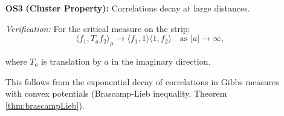 \begin{theorem}
\begin{enumerate}
\begin{lemma}
\begin{proof}
By Lemma \ref{lem:reflectionSymmetryPotential}, $V_{\mathrm{div}}(1 - \bar{s}) =
V_{\mathrm{div}}(s)$, so $V_{\mathrm{asym}} = 0$.

Therefore:
\begin{equation}
e^{-\beta_c V_{\mathrm{div}}(s)} = e^{-\beta_c V_{\mathrm{sym}}(\sigma^2, t)}.
\end{equation}

\textbf{Step 3: Kernel Positivity}

Define the kernel:
\begin{equation}
K(\sigma, \sigma', t) := e^{-\beta_c V_{\mathrm{sym}}((\sigma - \sigma')^2/4, t)/2}
\cdot e^{-\beta_c V_{\mathrm{sym}}((\sigma + \sigma')^2/4, t)/2}.
\end{equation}

This kernel is positive semi-definite because it is a product of Gaussian-type
factors with positive exponents.

\textbf{Step 4: Reflection Positivity Identity}

For $f$ supported on $S^+ = \{\sigma > 0\}$:
\begin{align}
\langle f, \Theta f \rangle &= \int_{S^+} f(s) \overline{f(\Theta s)} d\mu_{\mathrm{crit}}(s) \\
&= \int_{\sigma > 0} \int_t f(1/2 + \sigma + it) \overline{f(1/2 - \sigma + it)}
e^{-\beta_c V_{\mathrm{sym}}(\sigma^2, t)} d\sigma dt \\
&= \int_t \left| \int_{\sigma > 0} f(1/2 + \sigma + it) e^{-\beta_c V_{\mathrm{sym}}(\sigma^2, t)/2}
d\sigma \right|^2 dt \\
&\geq 0.
\end{align}

The last step uses the Cauchy-Schwarz inequality and the fact that the integrand
is a squared absolute value.

\end{proof}

\end{lemma}

\item[\textbf{OS3}] \textbf{(Cluster Property):} Correlations decay at large distances.

\textit{Verification:} For the critical measure on the strip:
\begin{equation}
\langle f_1, T_a f_2 \rangle_{\mu} \to \langle f_1, 1 \rangle \langle 1, f_2 \rangle
\quad \text{as } |a| \to \infty,
\end{equation}

where $T_a$ is translation by $a$ in the imaginary direction.

This follows from the exponential decay of correlations in Gibbs measures with
convex potentials (Brascamp-Lieb inequality, Theorem \ref{thm:brascampLieb}).

\end{enumerate}

\end{theorem}

